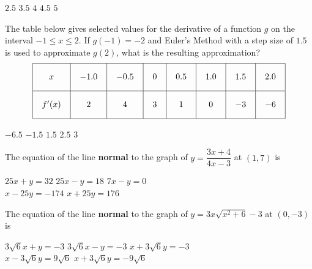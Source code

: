 \begin{questions}
    \begin{oneparchoices}
        \choice $2.5$
        \choice $3.5$
        \choice $4$
        \choice $4.5$
        \choice $5$
    \end{oneparchoices} \par \horizontalline

    \question The table below gives selected values for the derivative of a function $g$ on the interval $-1 \leq x \leq 2$. If $g(-1) = -2$ and Euler's Method with a step size of $1.5$ is used to approximate $g(2)$, what is the resulting approximation? \begin{align*}
        \arraycolsep=11pt\def\arraystretch{2.2}
        \begin{array}{|c|c|c|c|c|c|c|c|}
            \hline
            x & -1.0 & -0.5 & 0 & 0.5 & 1.0 & 1.5 & 2.0 \\[5.5pt] \hline
            f'(x) & 2 & 4 & 3 & 1 & 0 & -3 & -6 \\[5.5pt]
            \hline
        \end{array}
    \end{align*}

    \begin{oneparchoices}
        \choice $-6.5$
        \choice $-1.5$
        \choice $1.5$
        \choice $2.5$
        \choice $3$
    \end{oneparchoices} \par \horizontalline

    \question The equation of the line \textbf{normal} to the graph of $y = \dfrac{3x + 4}{4x - 3}$ at $(1, 7)$ is \\

    \begin{oneparchoices}
        \choice $25x + y = 32$ 
        \choice $25x - y = 18$
        \choice $7x - y = 0$ \\[11pt]
        \makebox[0.23\textwidth] \choice $x - 25y = -174$ 
        \makebox[0.23\textwidth] \choice $x + 25y = 176$
    \end{oneparchoices} \par \horizontalline

    \question The equation of the line \textbf{normal} to the graph of $y = 3x\sqrt{x^2 + 6} - 3$ at $(0, -3)$ is \\

    \begin{oneparchoices}
        \choice $3\sqrt{6}x + y = -3$
        \choice $3\sqrt{6}x - y = -3$
        \choice $x + 3\sqrt{6}y = -3$ \\[11pt]
        \makebox[0.2\textwidth] \choice $x - 3\sqrt{6}y = 9\sqrt{6}$
        \makebox[0.23\textwidth] \choice $x + 3\sqrt{6}y = -9\sqrt{6}$
    \end{oneparchoices} \par \horizontalline
\end{questions}